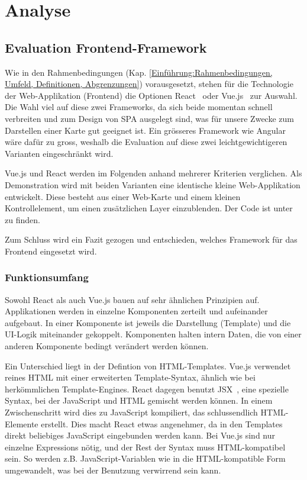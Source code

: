 
\section{Analyse}
\label{Analyse}


\subsection{Evaluation Frontend-Framework}
\label{Analyse:Evaluation Frontend-Framework}

Wie in den Rahmenbedingungen (Kap. \ref{Einführung:Rahmenbedingungen, Umfeld, Definitionen, Abgrenzungen}) vorausgesetzt, stehen für die Technologie der Web-Applikation (Frontend) die Optionen React~\cite{react} oder Vue.js~\cite{vuejs} zur Auswahl.
Die Wahl viel auf diese zwei Frameworks, da sich beide momentan schnell verbreiten und zum Design von \ac{SPA} ausgelegt sind, was für unsere Zwecke zum Darstellen einer Karte gut geeignet ist.
Ein grösseres Framework wie Angular wäre dafür zu gross, weshalb die Evaluation auf diese zwei leichtgewichtigeren Varianten eingeschränkt wird.

Vue.js und React werden im Folgenden anhand mehrerer Kriterien verglichen.
Als Demonstration wird mit beiden Varianten eine identische kleine Web-Applikation entwickelt.
Diese besteht aus einer Web-Karte und einem kleinen Kontrollelement, um einen zusätzlichen Layer einzublenden.
Der Code ist unter~\cite{github:playground} zu finden.

Zum Schluss wird ein Fazit gezogen und entschieden, welches Framework für das Frontend eingesetzt wird.

\subsubsection{Funktionsumfang}
\label{Analyse Framework:Funktionsumfang}

Sowohl React als auch Vue.js bauen auf sehr ähnlichen Prinzipien auf.
Applikationen werden in einzelne Komponenten zerteilt und aufeinander aufgebaut.
In einer Komponente ist jeweils die Darstellung (Template) und die UI-Logik miteinander gekoppelt.
Komponenten halten intern Daten, die von einer anderen Komponente bedingt verändert werden können.

Ein Unterschied liegt in der Defintion von HTML-Templates.
Vue.js verwendet reines HTML mit einer erweiterten Template-Syntax, ähnlich wie bei herkömmlichen Template-Engines.
React dagegen benutzt JSX~\cite{jsx}, eine spezielle Syntax, bei der JavaScript und HTML gemischt werden können.
In einem Zwischenschritt wird dies zu JavaScript kompiliert, das schlussendlich HTML-Elemente erstellt.
Dies macht React etwas angenehmer, da in den Templates direkt beliebiges JavaScript eingebunden werden kann.
Bei Vue.js sind nur einzelne Expressions nötig, und der Rest der Syntax muss HTML-kompatibel sein.
So werden z.B. JavaScript-Variablen wie  in die HTML-kompatible Form  umgewandelt, was bei der Benutzung verwirrend sein kann.

